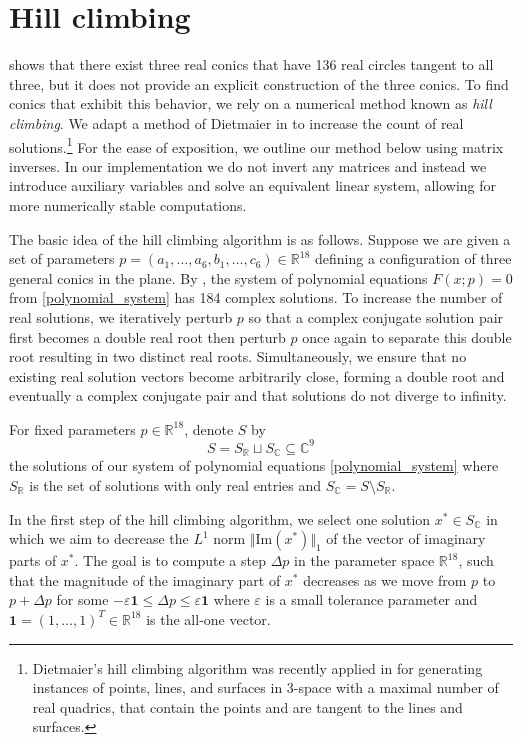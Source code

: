 \documentclass[12pt]{amsart}
\theoremstyle{definition}
\theoremstyle{definition}
\numberwithin{equation}{section}
\newcommand{\RR}{\mathbb{R}}
\begin{document}
\section{Hill climbing}\label{sec:hillClimbing}
 shows that there exist three real conics that have 136 real circles tangent to all three, but it does not provide an explicit construction of the three conics. To find conics that exhibit this behavior, we rely on a numerical method known as \emph{hill climbing}. We adapt a method of Dietmaier in \cite{LinearProgram} to increase the count of real solutions.\footnote{Dietmaier's hill climbing algorithm was recently applied in \cite{TangentQuadrics} for generating instances of points, lines, and surfaces in 3-space with a maximal number of real quadrics, that contain the points and are tangent to the lines and surfaces.} For the ease of exposition, we outline our method below using matrix inverses. In our implementation we do not invert any matrices and instead we introduce auxiliary variables and solve an equivalent linear system, allowing for more numerically stable computations.
 

The basic idea of the hill climbing algorithm is as follows. Suppose we are given a set of parameters $p=(a_{1},\dots,a_{6},b_{1},\dots, c_{6})\in\mathbb{R}^{18}$ defining a configuration of three general conics in the plane. By , the system of polynomial equations $F(x;p)=0$ from \eqref{polynomial_system} has 184 complex solutions. To increase the number of real solutions, we iteratively perturb $p$ so that a complex conjugate solution pair first becomes a double real root then perturb $p$ once again to separate this double root resulting in two distinct real roots. Simultaneously, we ensure that no existing real solution vectors become arbitrarily close, forming a double root and eventually a complex conjugate pair and that solutions do not diverge to infinity. 

For fixed parameters $p \in \RR^{18}$, denote $S$ by
$$S=S_{\mathbb{R}}\sqcup S_{\mathbb{C}}\subseteq\mathbb{C}^{9}$$
the solutions of our system of polynomial equations \eqref{polynomial_system} where $S_{\mathbb{R}}$ is the set of solutions with only real entries and $S_{\mathbb{C}} = S\setminus S_{\mathbb{R}}$.

In the first step of the hill climbing algorithm, we select one solution $x^{*}\in S_{\mathbb{C}}$ in which we aim to decrease the $L^1$ norm $\Vert\mathrm{Im}(x^{*})\Vert_{1}$ of the vector of imaginary parts of $x^*$. The goal is to compute a step $\Delta p$ in the parameter space $\mathbb{R}^{18}$, such that the magnitude of the imaginary part of $x^{*}$ decreases as we move from $p$ to $p+\Delta p$ for some $-\varepsilon\mathbf{1}\leq\Delta p\leq \varepsilon\mathbf{1}$ where $\varepsilon$ is a small tolerance parameter and $\mathbf{1}=(1,\ldots,1)^T\in\mathbb R^{18}$ is the all-one vector.
\end{document}
